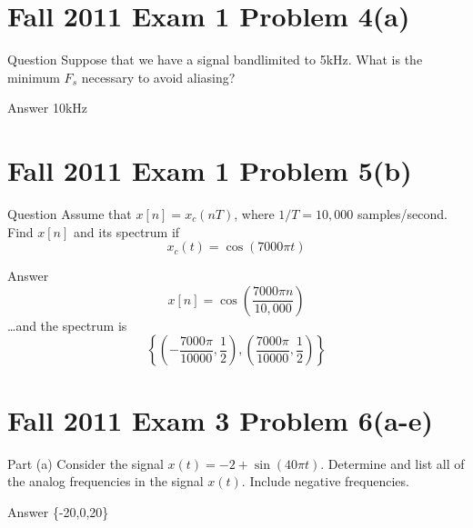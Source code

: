 \documentclass{beamer}
\begin{document}
\section[11x1p4a]{Fall 2011 Exam 1 Problem 4(a)}
\setcounter{subsection}{1}

\begin{frame}
  \begin{block}{Question}
  Suppose that we have a signal bandlimited to 5kHz.  
  What is the minimum $F_s$ necessary to avoid aliasing?
  \end{block}
  \begin{block}{Answer}
    10kHz
  \end{block}
\end{frame}

\section[11x1p5b]{Fall 2011 Exam 1 Problem 5(b)}
\setcounter{subsection}{1}

\begin{frame}
  \begin{block}{Question}
    Assume that $x[n]=x_c(nT)$, where $1/T=10,000$
    samples/second. Find $x[n]$ and its spectrum if
    \[
    x_c(t) = \cos(7000\pi t)
    \]
  \end{block}
  \begin{block}{Answer}
    \[
    x[n] = \cos\left(\frac{7000\pi n}{10,000}\right)
    \]
    \ldots and the spectrum is
    \[
    \left\{(-\frac{7000\pi}{10000},\frac{1}{2}),(\frac{7000\pi}{10000},\frac{1}{2})\right\}
    \]
  \end{block}
\end{frame}

\section[11x3p6]{Fall 2011 Exam 3 Problem 6(a-e)}
\setcounter{subsection}{1}

\begin{frame}
  \begin{block}{Part (a)}
    Consider the signal $x(t)=-2+\sin(40\pi t)$.
    Determine and list all of the analog
    frequencies in the signal $x(t)$.  Include negative frequencies.
  \end{block}
  \begin{block}{Answer}
    \{-20,0,20\}
  \end{block}
\end{frame}
\end{document}
